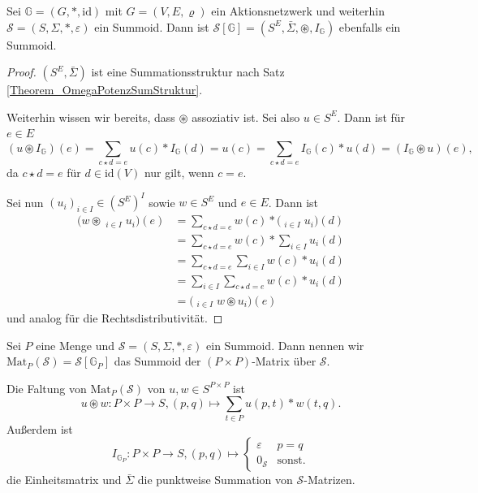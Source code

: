 \documentclass{article}
\DeclareMathOperator*{\sumbar}{\overline{\sum}}
\begin{document}
\begin{theorem}
  Sei $\mathbb{G} = (G, \ast, \text{id})$ mit $G = (V, E, \varrho)$ ein Aktionsnetzwerk
  und weiterhin $\mathcal{S} = (S, \Sigma, \ast, \varepsilon)$ ein Summoid.
  Dann ist $\mathcal{S}[\mathbb{G}] = (S^E, \bar\Sigma, \circledast, I_\mathbb{G})$ ebenfalls ein Summoid.
\end{theorem}
\begin{proof}
  $(S^E, \bar\Sigma)$ ist eine Summationsstruktur nach Satz \ref{Theorem_OmegaPotenzSumStruktur}.
  
  Weiterhin wissen wir bereits, dass $\circledast$ assoziativ ist.
  Sei also $u \in S^E$.
  Dann ist für $e \in E$
  \begin{equation*}
    (u \circledast I_\mathbb{G})(e) 
    = \sum_{c \star d = e} u(c) \ast I_\mathbb{G}(d)
    = u(c)
    = \sum_{c \star d = e} I_\mathbb{G}(c) \ast u(d)
    = (I_\mathbb{G} \circledast u)(e),
  \end{equation*}
  da $c \star d = e$ für $d \in \text{id}(V)$ nur gilt, wenn $c = e$.

  Sei nun $(u_i)_{i \in I} \in (S^E)^I$ sowie $w \in S^E$ und $e \in E$.
  Dann ist
  \begin{align*}
    \bigg( w \circledast \sumbar_{i \in I} u_i \bigg)(e)
    &= \sum_{c \star d = e} w(c) \ast \bigg( \sumbar_{i \in I} u_i \bigg)(d) \\
    &= \sum_{c \star d = e} w(c) \ast \sum_{i \in I} u_i(d) \\
    &= \sum_{c \star d = e} \sum_{i \in I} w(c) \ast u_i(d) \\
    &= \sum_{i \in I} \sum_{c \star d = e} w(c) \ast u_i(d) \\
    &= \bigg( \sumbar_{i \in I} w \circledast u_i \bigg)(e)
  \end{align*}
  und analog für die Rechtsdistributivität.
\end{proof}

\begin{definition}
  Sei $P$ eine Menge und $\mathcal{S} = (S, \Sigma, \ast, \varepsilon)$ ein Summoid.
  Dann nennen wir $\text{Mat}_P(\mathcal{S}) = \mathcal{S}[\mathbb{G}_P]$ das Summoid der $(P \times P)$-Matrix über $\mathcal{S}$.
\end{definition}

\begin{remark}
  Die Faltung von $\text{Mat}_P(\mathcal{S})$ von $u, w \in S^{P \times P}$ ist
  \begin{equation*}
    u \circledast w \colon P \times P \to S, (p, q) \mapsto \sum_{t \in P} u(p, t) \ast w(t, q).
  \end{equation*}
  Außerdem ist
  \begin{equation*}
    I_{\mathbb{G}_P} \colon P \times P \to S, (p, q) \mapsto
    \begin{cases}
      \varepsilon & p = q \\
      0_\mathcal{S} & \text{sonst.}
    \end{cases}
  \end{equation*}
  die Einheitsmatrix und $\bar\Sigma$ die punktweise Summation von $\mathcal{S}$-Matrizen.
\end{remark}
\end{document}
